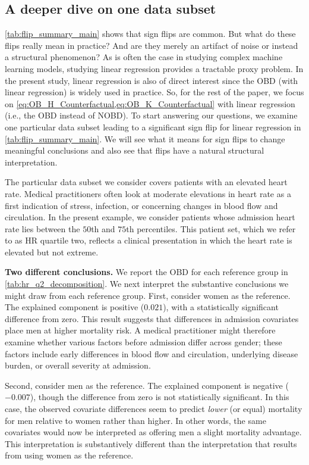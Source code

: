 \subsection{A deeper dive on one data subset}

\cref{tab:flip_summary_main} shows that sign flips are common.
But what do these flips really mean in practice?
And are they merely an artifact of noise or instead a structural phenomenon?
As is often the case in studying complex machine learning models, studying linear regression provides a tractable proxy problem.
In the present study, linear regression is also of direct interest since the OBD (with linear regression) is widely used in practice.
So, for the rest of the paper, we focus on \cref{eq:OB_H_Counterfactual,eq:OB_K_Counterfactual} with linear regression (i.e., the OBD instead of NOBD).
To start answering our questions, we examine one particular data subset leading to a significant sign flip for linear regression in \cref{tab:flip_summary_main}.
We will see what it means for sign flips to change meaningful conclusions and also see that flips have a natural structural interpretation.

The particular data subset we consider covers patients with an elevated heart rate.
Medical practitioners often look at moderate elevations in heart rate as a first indication of stress, infection, or concerning changes in blood flow and circulation. In the present example, we consider patients whose admission heart rate lies between the $50$th and $75$th percentiles. This patient set, which we refer to as HR quartile two, reflects a clinical presentation in which the heart rate is elevated but not extreme.

\textbf{Two different conclusions.} 
We report the OBD for each reference group in \cref{tab:hr_q2_decomposition}. We next interpret the substantive conclusions
we might draw from each reference group. First, consider women as the reference. The explained component is positive ($0.021$), with a statistically significant difference from zero.
This result suggests that differences in admission covariates place men at higher mortality risk. A medical practitioner might therefore examine whether various factors before admission differ across gender; these factors include early differences in blood flow and circulation, underlying disease burden, or overall severity at admission.

Second, consider men as the reference. The explained component is negative ($-0.007$), though the difference from zero is not statistically significant. In this case, the observed covariate differences seem to predict \emph{lower} (or equal) mortality for men relative to women rather than higher. In other words, the same covariates would now be interpreted as offering men a slight mortality advantage. This interpretation is substantively different than the interpretation that results from using women as the reference.

